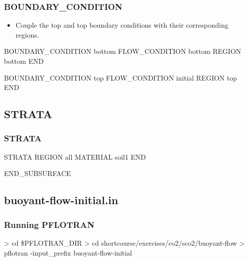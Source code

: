 \documentclass{beamer}
\newcommand\greencomment[1]{{{\color{green} #1}}}
\begin{document}
\begin{frame}[fragile]\frametitle{BOUNDARY\_CONDITION}

\begin{itemize}
\item Couple the \greencomment{top} and \greencomment{top} boundary conditions with their corresponding regions.
\end{itemize}

\begin{semiverbatim}
BOUNDARY_CONDITION bottom
  FLOW_CONDITION bottom
  REGION bottom
END

BOUNDARY_CONDITION top
  FLOW_CONDITION initial
  REGION top
END
\end{semiverbatim}

\end{frame}


\subsection{STRATA}

\begin{frame}[fragile]\frametitle{STRATA}

\begin{semiverbatim}

STRATA
  REGION all
  MATERIAL soil1
END

END_SUBSURFACE

\end{semiverbatim}

\end{frame}

\subsection{buoyant-flow-initial.in}

\begin{frame}[fragile]\frametitle{Running PFLOTRAN}

\begin{semiverbatim}

> cd \$PFLOTRAN_DIR
> cd shortcourse/exercises/co2/sco2/buoyant-flow
> pflotran -input_prefix buoyant-flow-initial

\end{semiverbatim}

\end{frame}
\end{document}
